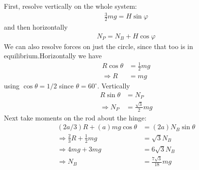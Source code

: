 \begin{problem}[A1989FMIIQ1a]
{ First, resolve vertically on the whole system:
\begin{align*}
\frac{3}{2}mg=H\sin\varphi
\end{align*}
and then horizontally
\begin{align*}
N_P=N_B+H\cos\varphi
\end{align*}
We can also resolve forces on just the circle, since that too is in equilibrium.Horizontally we have
\begin{align*}
R\cos\theta&=\frac{1}{2}mg \\
\Rightarrow R&=mg
\end{align*}
using $\cos\theta=1/2$ since $\theta=60^\circ$. Vertically
\begin{align*}
R\sin\theta&=N_P \\
\Rightarrow N_P&=\frac{\sqrt 3}{2}mg
\end{align*}
Next take moments on the rod about the hinge:
\begin{align*}
(2a/3)R+(a)mg\cos\theta&=(2a)N_B\sin\theta \\
\Rightarrow \frac{2}{3}R+\frac{1}{2}mg&=\sqrt 3N_B \\
\Rightarrow 4mg+3mg&=6\sqrt 3N_B \\
\Rightarrow N_B&=\frac{7\sqrt 3}{18}mg
\end{align*}
}
\end{problem}